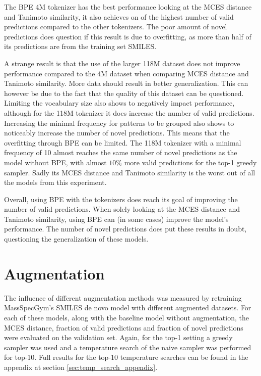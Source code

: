 The \ac{BPE} 4M tokenizer has the best performance looking at the MCES distance and Tanimoto similarity, it also achieves on of the highest number of valid predictions compared to the other tokenizers.
The poor amount of novel predictions does question if this result is due to overfitting, as more than half of its predictions are from the training set SMILES.

A strange result is that the use of the larger 118M dataset does not improve performance compared to the 4M dataset when comparing MCES distance and Tanimoto similarity.
More data should result in better generalization.
This can however be due to the fact that the quality of this dataset can be questioned.
Limiting the vocabulary size also shows to negatively impact performance, although for the 118M tokenizer it does increase the number of valid predictions.
Increasing the minimal frequency for patterns to be grouped also shows to noticeably increase the number of novel predictions.
This means that the overfitting through \ac{BPE} can be limited.
The 118M tokenizer with a minimal frequency of 10 almost reaches the same number of novel predictions as the model without \ac{BPE}, with almost $10\%$ more valid predictions for the top-1 greedy sampler.
Sadly its MCES distance and Tanimoto similarity is the worst out of all the models from this experiment.

Overall, using \ac{BPE} with the tokenizers does reach its goal of improving the number of valid predictions.
When solely looking at the MCES distance and Tanimoto similarity, using \ac{BPE} can (in some cases) improve the model's performance.
The number of novel predictions does put these results in doubt, questioning the generalization of these models.

\section{Augmentation}

The influence of different augmentation methods was measured by retraining MassSpecGym's SMILES de novo model with different augmented datasets.
For each of these models, along with the baseline model without augmentation, the MCES distance, fraction of valid predictions and fraction of novel predictions were evaluated on the validation set.
Again, for the top-1 setting a greedy sampler was used and a temperature search of the naive sampler was performed for top-10.
Full results for the top-10 temperature searches can be found in the appendix at section \ref{sec:temp_search_appendix}.

